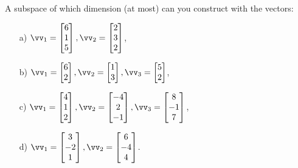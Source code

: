 \begin{problem}%
    A subspace of which dimension (at most) can you construct with the vectors:
    \begin{enumerate}
        \item[a) ] $\vv_1=\begin{bmatrix}6\\1\\5\end{bmatrix},  \vv_2=\begin{bmatrix}
            2\\3\\2
        \end{bmatrix}$,

        
        \item[b) ] $\vv_1=\begin{bmatrix}6\\2\end{bmatrix},  \vv_2=\begin{bmatrix}
            1\\3
        \end{bmatrix},  \vv_3=\begin{bmatrix}
            5\\2
        \end{bmatrix}$,
        
        \item[c) ] $\vv_1=\begin{bmatrix}4\\1\\2\end{bmatrix},  \vv_2=\begin{bmatrix}
            -4\\2\\-1
        \end{bmatrix},  \vv_3=\begin{bmatrix}
            8\\-1\\7
        \end{bmatrix}$,
        
        \item[d) ] $\vv_1=\begin{bmatrix}3\\-2\\1\end{bmatrix},  \vv_2=\begin{bmatrix}
            6\\-4\\4
        \end{bmatrix}$.
        
    \end{enumerate}
\end{problem}

